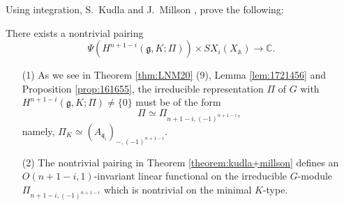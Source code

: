 \medskip
Using integration, 
 S.~Kudla and J.~Millson \cite{KM2}, \cite[Thm.~7.1]{KM-II} prove the following:
\begin{theorem} 
\label{theorem:kudla+millson}
There exists a nontrivial pairing
\[ 
\Psi(H^{n+1-i}({\mathfrak g},K; \Pi) ) \times SX_i(X_{\mathbb A})  \rightarrow {\mathbb C}. 
\]
\end{theorem}


\begin{remark}
\begin{enumerate}
\item[{\rm{(1)}}]
As we see in Theorem \ref{thm:LNM20} (9), 
 Lemma \ref{lem:1721456}
 and Proposition \ref{prop:161655}, 
 the irreducible representation $\Pi$ of $G$
 with $H^{n+1-i}({\mathfrak{g}},K; \Pi) \ne \{0\}$
 must be of the form
\[
   \Pi \simeq \Pi_{n+1-i, (-1)^{n+1-i}}, 
\]
namely,
 $\Pi_K \simeq (A_{\mathfrak{q}_i})_{-,(-1)^{n+1-i}}$.  
\item[{\rm{(2)}}]
The nontrivial pairing in Theorem \ref{theorem:kudla+millson}
 defines an $O(n+1-i,1)$-invariant linear functional
 on the irreducible $G$-module $\Pi_{n+1-i, (-1)^{n+1-i}}$
 which is nontrivial on the minimal $K$-type. 
\end{enumerate}
\end{remark} 
